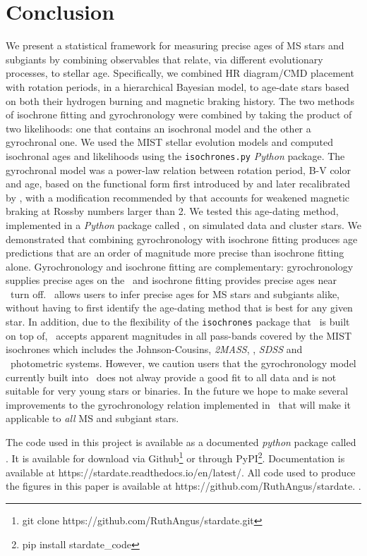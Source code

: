 \section{Conclusion}
\label{section:conclusion}

We present a statistical framework for measuring precise ages of MS stars and
subgiants by combining observables that relate, via different evolutionary
processes, to stellar age.
Specifically, we combined HR diagram/CMD placement with rotation periods, in a
hierarchical Bayesian model, to age-date stars based on both their hydrogen
burning and magnetic braking history.
The two methods of isochrone fitting and gyrochronology were combined by
taking the product of two likelihoods: one that contains an isochronal model
and the other a gyrochronal one.
We used the MIST stellar evolution models and computed isochronal ages and
likelihoods using the {\tt isochrones.py} {\it Python} package.
The gyrochronal model was a power-law relation between rotation period, B-V
color and age, based on the functional form first introduced by
\citet{barnes2003} and later recalibrated by \citet{angus2015}, with a
modification recommended by \citet{vansaders2016} that accounts for weakened
magnetic braking at Rossby numbers larger than 2.
We tested this age-dating method, implemented in a {\it Python} package called
\sd, on simulated data and cluster stars.
We demonstrated that combining gyrochronology with isochrone fitting produces
age predictions that are an order of magnitude more precise than isochrone
fitting alone.
Gyrochronology and isochrone fitting are complementary: gyrochronology
supplies precise ages on the \MS\ and isochrone fitting provides precise ages
near \MS\ turn off.
\sd\ allows users to infer precise ages for MS stars and subgiants alike,
without having to first identify the age-dating method that is best for any
given star.
In addition, due to the flexibility of the {\tt isochrones} package that \sd\
is built on top of, \sd\ accepts apparent magnitudes in all pass-bands covered
by the MIST isochrones which includes the Johnson-Cousins, {\it 2MASS},
\Kepler, {\it SDSS} and \Gaia\ photometric systems.
However, we caution users that the gyrochronology model currently built into
\sd\ does not alway provide a good fit to all data and is not suitable for
very young stars or binaries.
In the future we hope to make several improvements to the gyrochronology
relation implemented in \sd\ that will make it applicable to {\it all} MS and
subgiant stars.

The code used in this project is available as a documented {\it python}
package called \sd.
It is available for download via Github\footnote{git clone
https://github.com/RuthAngus/stardate.git} or through
PyPI\footnote{pip install stardate\_code}.
Documentation is available at https://stardate.readthedocs.io/en/latest/.
All code used to produce the figures in this paper is available at
https://github.com/RuthAngus/stardate.
.
